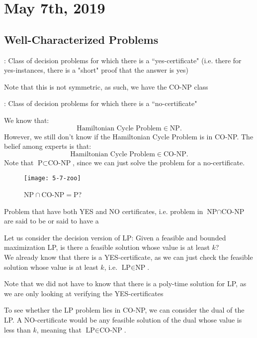 \documentclass[../main/main.tex]{subfiles}
\begin{document}
\section{May  7th, 2019}
\subsection{Well-Characterized Problems}
\begin{definition}
	: Class of decision problems for which there is a ``yes-certificate" (i.e. there for yes-instances, there is a "short" proof that the answer is yes)
\end{definition}
Note that this is not symmetric, as such, we have the CO-NP class
\begin{definition}
	: Class of decision problems for which there is a ``no-certificate"
\end{definition}
We know that: \[
\text{Hamiltonian Cycle Problem}\in \text{NP}
.\] However, we still don't know if the Hamiltonian Cycle Problem is in CO-NP. The belief among experts is that: \[
\text{Hamiltonian Cycle Problem} \in \text{CO-NP}
.\] 
Note that $\text{P}\subset \text{CO-NP}$, since we can just solve the problem for a no-certificate.
\begin{figure}[htpb]
	\centering
	\texttt{[image: 5-7-zoo]}
	\caption{$\text{NP}\cap \text{CO-NP}=\text{P}$?}
	\label{fig:5-7-zoo}
\end{figure}
\begin{definition}
	
	Problem that have both YES and NO certificates, i.e. problem in $\text{NP}\cap \text{CO-NP}$ are said to be  or said to have a 
\end{definition}
Let us consider the decision version of LP: Given a feasible and bounded maximization LP, is there a feasible solution whose value is at least $k$?\\

We already know that there is a YES-certificate, as we can just check the feasible solution whose value is at least $k$, i.e.  $\text{LP}\in \text{NP}$. 
\begin{remark}
	Note that we did not have to know that there is a poly-time solution for LP, as we are only looking at verifying the YES-certificates
\end{remark}
To see whether the LP problem lies in CO-NP, we can consider the dual of the LP. A NO-certificate would be any feasible solution of the dual whose value is less than $k$, meaning that $\text{LP}\in \text{CO-NP}$.\\
\end{document}
